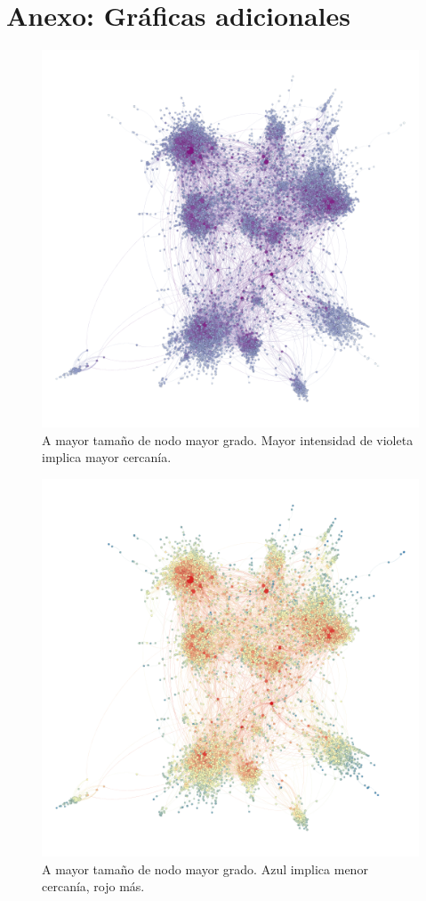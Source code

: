\section{Anexo: Gráficas adicionales}

\begin{figure}[ht]
    \centering
    \includegraphics[width=1\textwidth,angle=90]{img/resultados/grado-cercania.png}
    \caption{A mayor tamaño de nodo mayor grado. Mayor intensidad de violeta implica mayor cercanía.}
\end{figure}

\begin{figure}[ht]
    \centering
    \includegraphics[width=1\textwidth,angle=90]{img/resultados/grado-cercania2.png}
    \caption{A mayor tamaño de nodo mayor grado. Azul implica menor cercanía, rojo más.}
\end{figure}

